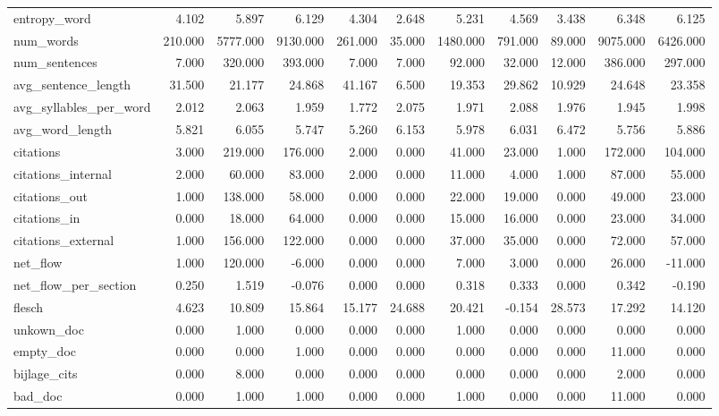 \begin{tabular}{lrrrrrrrrrr}
\cline{1-11}
entropy\_word & 4.102 & 5.897 & 6.129 & 4.304 & 2.648 & 5.231 & 4.569 & 3.438 & 6.348 & 6.125 \\
\cline{1-11}
num\_words & 210.000 & 5777.000 & 9130.000 & 261.000 & 35.000 & 1480.000 & 791.000 & 89.000 & 9075.000 & 6426.000 \\
\cline{1-11}
num\_sentences & 7.000 & 320.000 & 393.000 & 7.000 & 7.000 & 92.000 & 32.000 & 12.000 & 386.000 & 297.000 \\
\cline{1-11}
avg\_sentence\_length & 31.500 & 21.177 & 24.868 & 41.167 & 6.500 & 19.353 & 29.862 & 10.929 & 24.648 & 23.358 \\
\cline{1-11}
avg\_syllables\_per\_word & 2.012 & 2.063 & 1.959 & 1.772 & 2.075 & 1.971 & 2.088 & 1.976 & 1.945 & 1.998 \\
\cline{1-11}
avg\_word\_length & 5.821 & 6.055 & 5.747 & 5.260 & 6.153 & 5.978 & 6.031 & 6.472 & 5.756 & 5.886 \\
\cline{1-11}
citations & 3.000 & 219.000 & 176.000 & 2.000 & 0.000 & 41.000 & 23.000 & 1.000 & 172.000 & 104.000 \\
\cline{1-11}
citations\_internal & 2.000 & 60.000 & 83.000 & 2.000 & 0.000 & 11.000 & 4.000 & 1.000 & 87.000 & 55.000 \\
\cline{1-11}
citations\_out & 1.000 & 138.000 & 58.000 & 0.000 & 0.000 & 22.000 & 19.000 & 0.000 & 49.000 & 23.000 \\
\cline{1-11}
citations\_in & 0.000 & 18.000 & 64.000 & 0.000 & 0.000 & 15.000 & 16.000 & 0.000 & 23.000 & 34.000 \\
\cline{1-11}
citations\_external & 1.000 & 156.000 & 122.000 & 0.000 & 0.000 & 37.000 & 35.000 & 0.000 & 72.000 & 57.000 \\
\cline{1-11}
net\_flow & 1.000 & 120.000 & -6.000 & 0.000 & 0.000 & 7.000 & 3.000 & 0.000 & 26.000 & -11.000 \\
\cline{1-11}
net\_flow\_per\_section & 0.250 & 1.519 & -0.076 & 0.000 & 0.000 & 0.318 & 0.333 & 0.000 & 0.342 & -0.190 \\
\cline{1-11}
flesch & 4.623 & 10.809 & 15.864 & 15.177 & 24.688 & 20.421 & -0.154 & 28.573 & 17.292 & 14.120 \\
\cline{1-11}
unkown\_doc & 0.000 & 1.000 & 0.000 & 0.000 & 0.000 & 1.000 & 0.000 & 0.000 & 0.000 & 0.000 \\
\cline{1-11}
empty\_doc & 0.000 & 0.000 & 1.000 & 0.000 & 0.000 & 0.000 & 0.000 & 0.000 & 11.000 & 0.000 \\
\cline{1-11}
bijlage\_cits & 0.000 & 8.000 & 0.000 & 0.000 & 0.000 & 0.000 & 0.000 & 0.000 & 2.000 & 0.000 \\
\cline{1-11}
bad\_doc & 0.000 & 1.000 & 1.000 & 0.000 & 0.000 & 1.000 & 0.000 & 0.000 & 11.000 & 0.000 \\
\cline{1-11}
\bottomrule
\end{tabular}
